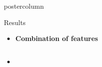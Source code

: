 \documentclass[final]{beamer}
\begin{document}
\begin{frame}
\begin{columns}
\begin{column}{.49\textwidth}
\begin{beamercolorbox}[center,wd=\textwidth]{postercolumn}
\begin{minipage}[T]{.95\textwidth}
{\begin{block}{Results}
\begin{itemize}
\begin{columns}
\begin{column}{.47\textwidth}
            	 	\end{column}
            	 \end{columns}
            	  \item \textbf{\color{orounam} Combination of features}
            	 \item []
            	 \begin{columns}
            	 	\begin{column}{.47\textwidth}
            	 		\\
            	 	\end{column}
            	 	\begin{column}{.47\textwidth}
            	 		 \\  

\end{column}
\end{columns}
\end{itemize}
\end{block}}
\end{minipage}
\end{beamercolorbox}
\end{column}
\end{columns}
\end{frame}
\end{document}
